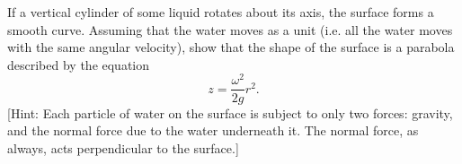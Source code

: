 \documentclass[a4paper]{exam}
\begin{document}
\begin{questions}
    \question {[Difficult]} If a vertical cylinder of some liquid rotates about its axis, the surface forms a smooth curve. Assuming that the water
              moves as a unit (i.e. all the water moves with the same angular velocity), show that the shape of the surface is a parabola described
              by the equation
              \begin{equation}
                z = \frac{\omega^2}{2g} r^2.
              \end{equation}
              [Hint: Each particle of water on the surface is subject to only two forces: gravity, and the normal force due to the water underneath
              it. The normal force, as always, acts perpendicular to the surface.]
  \end{questions}
\end{document}
